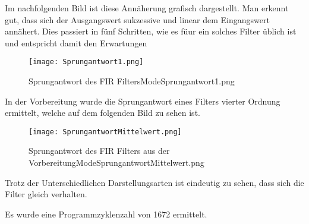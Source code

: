 Im nachfolgenden Bild ist diese Annäherung grafisch dargestellt. Man erkennt gut, dass sich der Ausgangswert sukzessive und linear dem Eingangswert annähert. 
Dies passiert in fünf Schritten, wie es füur ein solches Filter üblich ist und entspricht damit den Erwartungen
\begin{figure}[H]
  \centering
    \texttt{[image: Sprungantwort1.png]}
  \caption{Sprungantwort des FIR Filters\textunderscore Mode\textunderscore Sprungantwort1.png}
  \label{fig:SprAW1.png}%
\end{figure}
 In der Vorbereitung wurde die Sprungantwort eines Filters vierter Ordnung ermittelt, welche auf dem folgenden Bild zu sehen ist.
 \begin{figure}[H]
  \centering
    \texttt{[image: SprungantwortMittelwert.png]}
  \caption{Sprungantwort des FIR Filters aus der Vorbereitung\textunderscore Mode\textunderscore SprungantwortMittelwert.png}
  \label{fig:SprAW.png}%
\end{figure}
 Trotz der Unterschiedlichen Darstellungsarten ist eindeutig zu sehen, dass sich die Filter gleich verhalten.
 
 Es wurde eine Programmzyklenzahl von 1672 ermittelt.
 
